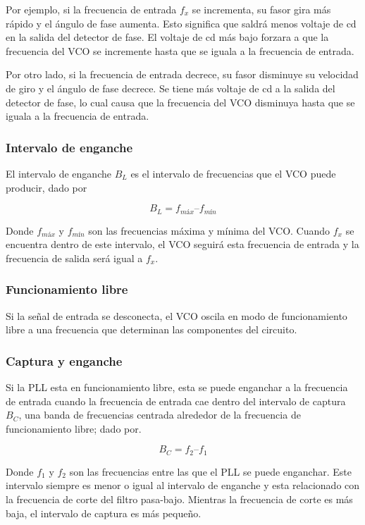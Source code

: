 \documentclass{article}
\begin{document}
Por ejemplo, si la frecuencia de entrada $f_x$ se incrementa, su fasor gira más rápido y el ángulo de fase aumenta. Esto significa que saldrá menos voltaje de cd en la salida del detector de fase. El voltaje de cd más bajo forzara a que la frecuencia del VCO se incremente hasta que se iguala a la frecuencia de entrada.

Por otro lado, si la frecuencia de entrada decrece, su fasor disminuye su velocidad de giro y el ángulo de fase decrece. Se tiene más voltaje de cd a la salida del detector de fase, lo cual causa que la frecuencia del VCO disminuya hasta que se iguala a la frecuencia de entrada.

\subsubsection{Intervalo de enganche}
El intervalo de enganche $B_L$ es el intervalo de frecuencias que el VCO puede producir, dado por 

\begin{equation}\label{bl}
B_L = f_{máx} – f_{mín} 
\end{equation}

Donde $f_{máx}$ y $f_{mín}$ son las frecuencias máxima y mínima del VCO.
Cuando $f_x$ se encuentra dentro de este intervalo, el VCO seguirá esta frecuencia de entrada y la frecuencia de salida será igual a $f_x$.

\subsubsection{Funcionamiento libre}
Si la señal de entrada se desconecta, el VCO oscila en modo de funcionamiento libre a una frecuencia que determinan las componentes del circuito. 

\subsubsection{Captura y enganche}
Si la PLL esta en funcionamiento libre, esta se 
puede enganchar a la frecuencia de entrada cuando la frecuencia de entrada cae dentro del intervalo de captura $B_C$, una banda de frecuencias centrada alrededor de la frecuencia de funcionamiento libre; dado por.

\begin{equation}\label{bc}
B_C = f_{2} – f_{1} 
\end{equation}

Donde $f_{1}$ y $f_{2}$ son las frecuencias entre las que el PLL se puede enganchar. Este intervalo siempre es menor o igual al intervalo de enganche y esta relacionado con la frecuencia de corte del filtro pasa-bajo. Mientras la frecuencia de corte es más baja, el intervalo de captura es más pequeño.
\end{document}

